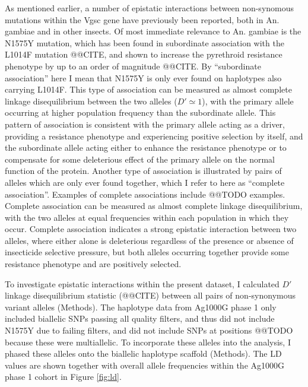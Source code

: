 \documentclass[a4paper,11pt,abstracton,hidelinks]{scrartcl}
\begin{document}
%
As mentioned earlier, a number of epistatic interactions between non-synomous mutations within the Vgsc gene have previously been reported, both in An. gambiae and in other insects.
%
Of most immediate relevance to An. gambiae is the N1575Y mutation, which has been found in subordinate association with the L1014F mutation @@CITE, and shown to increase the pyrethroid resistance phenotype by up to an order of magnitude @@CITE.
%
By ``subordinate association'' here I mean that N1575Y is only ever found on haplotypes also carrying L1014F.
%
This type of association can be measured as almost complete linkage disequilibrium between the two alleles ($D' \simeq 1$), with the primary allele occurring at higher population frequency than the subordinate allele.
%
This pattern of association is consistent with the primary allele acting as a driver, providing a resistance phenotype and experiencing positive selection by itself, and the subordinate allele acting either to enhance the resistance phenotype or to compensate for some deleterious effect of the primary allele on the normal function of the protein.
%
Another type of association is illustrated by pairs of alleles which are only ever found together, which I refer to here as ``complete association''.
%
Examples of complete associations include @@TODO examples.
%
Complete association can be measured as almost complete linkage disequilibrium, with the two alleles at equal frequencies within each population in which they occur.
%
Complete association indicates a strong epistatic interaction between two alleles, where either alone is deleterious regardless of the presence or absence of insecticide selective pressure, but both alleles occurring together provide some resistance phenotype and are positively selected.


%
To investigate epistatic interactions within the present dataset, I calculated $D'$ linkage disequilibrium statistic (@@CITE) between all pairs of non-synonymous variant alleles (Methods).
%
The haplotype data from Ag1000G phase 1 only included biallelic SNPs passing all quality filters, and thus did not include N1575Y due to failing filters, and did not include SNPs at positions @@TODO because these were multiallelic.
%
To incorporate these alleles into the analysis, I phased these alleles onto the biallelic haplotype scaffold (Methods).
%
The LD values are shown together with overall allele frequencies within the Ag1000G phase 1 cohort in Figure \ref{fig:ld}.
\end{document}
